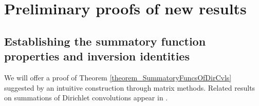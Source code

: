 \documentclass[11pt,reqno,a4letter]{article}
\numberwithin{figure}{section}
\numberwithin{table}{section}
\newcommand{\cf}{\textit{cf.\ }}
\theoremstyle{plain}
\numberwithin{theorem}{section}
\theoremstyle{definition}
\begin{document}
\begin{itemize}
\end{itemize} 

\newpage 
\section{Preliminary proofs of new results} 
\label{Section_PrelimProofs_Config} 

\subsection{Establishing the summatory function properties and inversion identities} 

We will offer a proof of Theorem \ref{theorem_SummatoryFuncsOfDirCvls} 
suggested by an intuitive construction through matrix methods. 
Related results on summations of Dirichlet convolutions appear in 
\cite[\S 2.14; \S 3.10; \S 3.12; \cf \S 4.9, p.\ 95]{APOSTOLANUMT}. 
\end{document}

